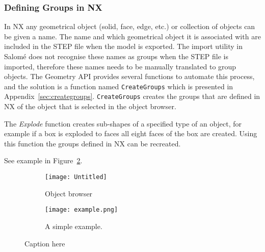 \subsubsection{Defining Groups in NX} %
\label{ssub:defining_groups_in_nx}
In NX any geometrical object (solid, face, edge, etc.) or collection of objects can be given a name. The name and which geometrical object it is associated with are included in the STEP file when the model is exported. The import utility in Salomé does not recognise these names as groups when the STEP file is imported, therefore these names needs to be manually translated to group objects. The Geometry API provides several functions to automate this process, and the solution is a function named \texttt{CreateGroups} which is presented in Appendix~\ref{sec:creategroups}. \texttt{CreateGroups} creates the groups that are defined in NX of the object that is selected in the object browser.

The \textit{Explode} function creates sub-shapes of a specified type of an object, for example if a box is exploded to faces all eight faces of the box are created. Using this function the groups defined in NX can be recreated.

See example in Figure~\ref{fig:example1}.

\begin{figure}[t]
	
\begin{subfigure}{.3\textwidth}
	\begin{center}
		\texttt{[image: Untitled]}
	\end{center}
	\caption{Object browser}
	\label{fig:objbrow}
\end{subfigure}
\begin{subfigure}{.7\textwidth}
	\begin{center}
		\texttt{[image: example.png]}
	\end{center}
	\caption{A simple example.}
	\label{fig:example1}
\end{subfigure}

	\caption{Caption here}
	\label{fig:figure1}
\end{figure}




